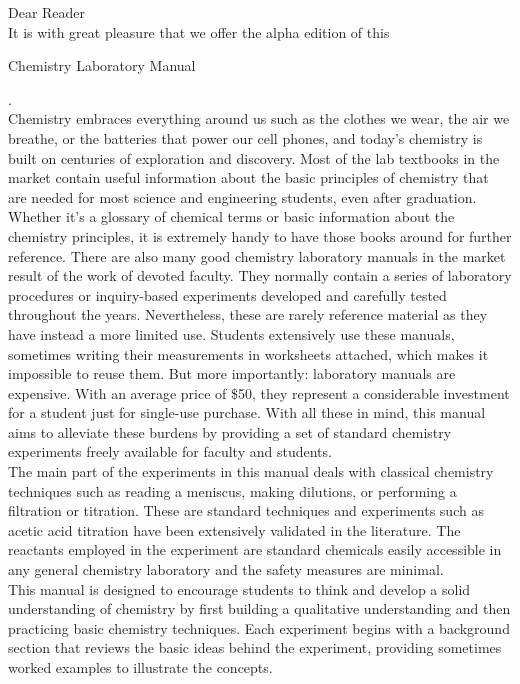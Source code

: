 \documentclass[main.tex]{subfiles}
\begin{document}
\pagestyle{style1}

\begin{fullwidth}
\begin{multicols*}{2}


Dear Reader\\
	It is with great pleasure that we offer the alpha edition of this\begin{it}Chemistry Laboratory Manual\end{it}. \\
	Chemistry embraces everything around us such as the clothes we wear, the air we breathe, or the batteries that power our cell phones, and today's chemistry is built on centuries of exploration and discovery. Most of the lab textbooks in the market contain useful information about the basic principles of chemistry that are needed for most science and engineering students, even after graduation. Whether it's a glossary of chemical terms or basic information about the chemistry principles, it is extremely handy to have those books around for further reference. There are also many good chemistry laboratory manuals in the market result of the work of devoted faculty. They normally contain a series of laboratory procedures or inquiry-based experiments developed and carefully tested throughout the years. Nevertheless, these are rarely reference material as they have instead a more limited use. Students extensively use these manuals, sometimes writing their measurements in worksheets attached, which makes it impossible to reuse them. But more importantly: laboratory manuals are expensive. With an average price of \$50, they represent a considerable investment for a student just for single-use purchase. With all these in mind, this manual aims to alleviate these burdens by providing a set of standard chemistry experiments freely available for faculty and students.\\
	The main part of the experiments in this manual deals with classical chemistry techniques such as reading a meniscus, making dilutions, or performing a filtration or titration. These are standard techniques and experiments such as acetic acid titration have been extensively validated in the literature. The reactants employed in the experiment are standard chemicals easily accessible in any general chemistry laboratory and the safety measures are minimal.\\
	This manual is designed to encourage students to think and develop a solid understanding of chemistry by first building a qualitative understanding and then practicing basic chemistry techniques. Each experiment begins with a background section that reviews the basic ideas behind the experiment, providing sometimes worked examples to illustrate the concepts. \\

\end{multicols*}
\end{fullwidth}
\end{document}
